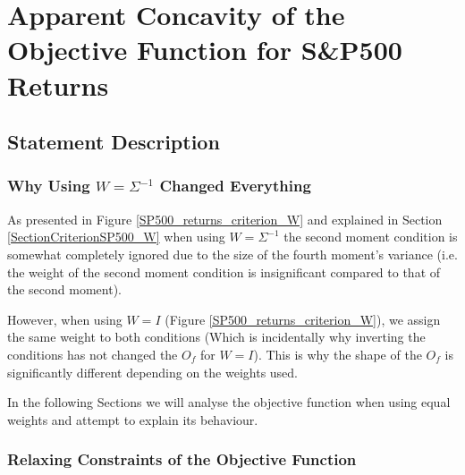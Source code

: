 \chapter{Apparent Concavity of the Objective Function for S\&P500 Returns} \label{ChapterSP_I}

\section{Statement Description}
\subsection{Why Using $W=\Sigma^{-1}$ Changed Everything}

As presented in Figure \ref{SP500_returns_criterion_W} and explained in Section \ref{SectionCriterionSP500_W} when using $W=\Sigma^{-1}$ the second moment condition is somewhat completely ignored due to the size of the fourth moment's variance (i.e. the weight of the second moment condition is insignificant compared to that of the second moment).
\smallskip\par
However, when using $W=I$ (Figure \ref{SP500_returns_criterion_W}), we assign the same weight to both conditions (Which is incidentally why inverting the conditions has not changed the $O_f$ for $W=I$). This is why the shape of the $O_f$ is significantly different depending on the weights used.
\smallskip\par
In the following Sections we will analyse the objective function when using equal weights and attempt to explain its behaviour.



\subsection{Relaxing Constraints of the Objective Function}

